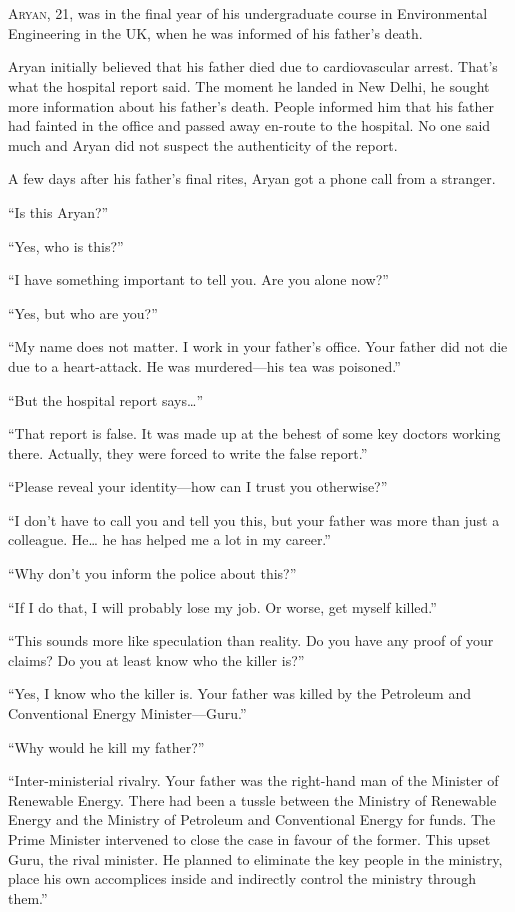\chapter{}

\lettrine{A}{ryan}, 21, was in the final year of his undergraduate course
in Environmental Engineering in the UK, when he was informed of his father's
death.

Aryan initially believed that his father died due to cardiovascular arrest.
That's what the hospital report said. The moment he landed in New Delhi, he
sought more information about his father's death. People informed him that his
father had fainted in the office and passed away en-route to the hospital. No
one said much and Aryan did not suspect the authenticity of the report.

A few days after his father's final rites, Aryan got a phone call from a stranger.

“Is this Aryan?”

“Yes, who is this?”

“I have something important to tell you. Are you alone now?”

“Yes, but who are you?”

“My name does not matter. I work in your father's office. Your father did not
die due to a heart-attack. He was murdered—his tea was poisoned.”

“But the hospital report says…”

“That report is false. It was made up at the behest of some key doctors working
there. Actually, they were forced to write the false report.”

“Please reveal your identity—how can I trust you otherwise?”

“I don't have to call you and tell you this, but your father was more than just
a colleague. He… he has helped me a lot in my career.”

“Why don't you inform the police about this?”

“If I do that, I will probably lose my job. Or worse, get myself killed.”

“This sounds more like speculation than reality. Do you have any proof of your
claims? Do you at least know who the killer is?”

“Yes, I know who the killer is. Your father was killed by the Petroleum and
Conventional Energy Minister—Guru.”

“Why would he kill my father?”

“Inter-ministerial rivalry. Your father was the right-hand man of the Minister
of Renewable Energy. There had been a tussle between the Ministry of Renewable Energy
and the Ministry of Petroleum and Conventional Energy for funds. The Prime Minister
intervened to close the case in favour of the former. This
upset Guru, the rival minister. He planned to eliminate the key people in the
ministry, place his own accomplices inside and indirectly
control the ministry through them.”

